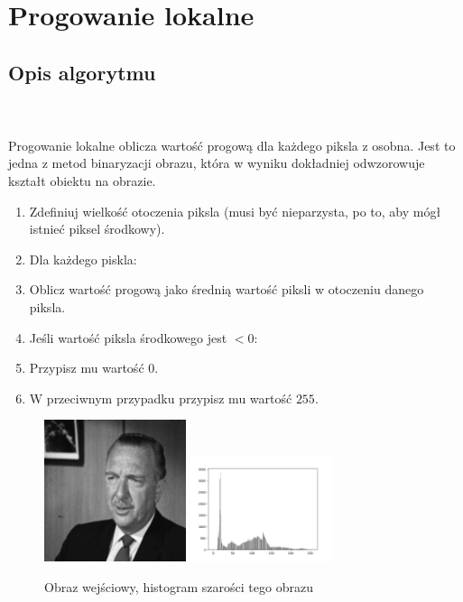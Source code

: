 \documentclass[final,a4paper,openany,12pt]{mwbk}
\begin{document}
\newpage





\section{Progowanie lokalne}
\subsection*{Opis algorytmu}
\hfill
\\\\
\indent Progowanie lokalne oblicza wartość progową dla każdego piksla z osobna. Jest to jedna z metod binaryzacji obrazu, która w wyniku dokładniej odwzorowuje kształt obiektu na obrazie.
\begin{enumerate}
	\item Zdefiniuj wielkość otoczenia piksla (musi być nieparzysta, po to, aby mógł istnieć piksel środkowy).
	\item Dla każdego piskla:
	\item Oblicz wartość progową jako średnią wartość piksli w otoczeniu danego piksla.
	\item Jeśli wartość piksla środkowego jest $< 0$:
	\item Przypisz mu wartość $0$.
	\item W przeciwnym przypadku przypisz mu wartość $255$.
\end{enumerate}

\begin{figure}[H]
	\begin{center}
		\includegraphics[width=0.37\textwidth]{gentelman_gray}
		\includegraphics[width=0.37\textwidth]{gentelman_gray_histogram}
	\end{center}
	\caption{Obraz wejściowy, histogram szarości tego obrazu}
\end{figure}
\end{document}

